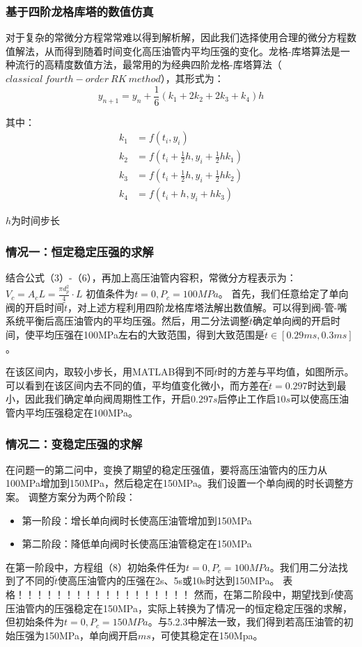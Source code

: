 \documentclass[withoutpreface,bwprint]{cumcmthesis} %
\begin{document}
			\subsubsection{基于四阶龙格库塔的数值仿真}
			对于复杂的常微分方程常常难以得到解析解，因此我们选择使用合理的微分方程数值解法，从而得到随着时间变化高压油管内平均压强的变化。龙格-库塔算法是一种流行的高精度数值方法，最常用的为经典四阶龙格-库塔算法（$classical\ fourth-order\ RK\ method$），其形式为：
			\[
			y_{n+1}=y_{n}+\frac{1}{6}(k_{1}+2k_{2}+2k_{3}+k_{4})h
			\]
			
			其中：
			\begin{align*}
			k_{1}&=f(t_{i},y_{i})\\
			k_{2}&=f(t_{i}+\frac{1}{2}h,y_{i}+\frac{1}{2}hk_{1})\\
			k_{3}&=f(t_{i}+\frac{1}{2}h,y_{i}+\frac{1}{2}hk_{2})\\
			k_{4}&=f(t_{i}+h,y_{i}+hk_{3})
			\end{align*}
			
			$h$为时间步长
			\subsubsection{情况一：恒定稳定压强的求解}
			结合公式（3）-（6），再加上高压油管内容积，常微分方程表示为：
			$V_c = A_cL = \frac{\pi d_p^2}{4} \cdot L$
			初值条件为$t = 0, P_c = 100MPa$。
			首先，我们任意给定了单向阀的开启时间$\widetilde{t}$，对上述方程利用四阶龙格库塔法解出数值解。可以得到阀-管-嘴系统平衡后高压油管内的平均压强。然后，用二分法调整$\widetilde{t}$确定单向阀的开启时间，使平均压强在100MPa左右的大致范围，得到大致范围是$\widetilde{t}\in [0.29ms,0.3ms]$。
			
			在该区间内，取较小步长，用MATLAB得到不同$\widetilde{t}$时的方差与平均值，如图所示。可以看到在该区间内去不同的值，平均值变化微小，而方差在$\widetilde{t}=0.297$时达到最小，因此我们确定单向阀周期性工作，开启$0.297s$后停止工作启$10s$可以使高压油管内平均压强稳定在100MPa。
			
			\subsubsection{情况二：变稳定压强的求解}
			在问题一的第二问中，变换了期望的稳定压强值，要将高压油管内的压力从100MPa增加到150MPa，然后稳定在150MPa。我们设置一个单向阀的时长调整方案。
			调整方案分为两个阶段：
			\begin{itemize}
				\item 第一阶段：增长单向阀时长使高压油管增加到150MPa
				\item 第二阶段：降低单向阀时长使高压油管稳定在150MPa
			\end{itemize}
			在第一阶段中，方程组（8）初始条件任为$t = 0, P_c = 100MPa$。我们用二分法找到了不同的$\widetilde{t}$使高压油管内的压强在2s、5s或10s时达到150MPa。
			表格！！！！！！！！！！！！！！！！！！
			然而，在第二阶段中，期望找到$\widetilde{t}$使高压油管内的压强稳定在150MPa，实际上转换为了情况一的恒定稳定压强的求解，但初始条件为$t = 0, P_c = 150MPa$。与5.2.3中解法一致，我们得到若高压油管的初始压强为150MPa，单向阀开启$ms$，可使其稳定在150Mpa。
			
\end{document}
